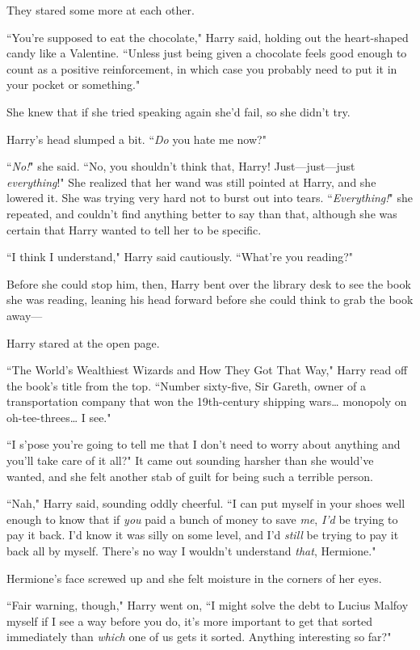 They stared some more at each other.

``You're supposed to eat the chocolate," Harry said, holding out the heart-shaped candy like a Valentine. ``Unless just being given a chocolate feels good enough to count as a positive reinforcement, in which case you probably need to put it in your pocket or something."

She knew that if she tried speaking again she'd fail, so she didn't try.

Harry's head slumped a bit. ``\emph{Do} you hate me now?"

``\emph{No!}" she said. ``No, you shouldn't think that, Harry! Just—just—just \emph{everything}!" She realized that her wand was still pointed at Harry, and she lowered it. She was trying very hard not to burst out into tears. ``\emph{Everything!}" she repeated, and couldn't find anything better to say than that, although she was certain that Harry wanted to tell her to be specific.

``I think I understand," Harry said cautiously. ``What're you reading?"

Before she could stop him, then, Harry bent over the library desk to see the book she was reading, leaning his head forward before she could think to grab the book away—

Harry stared at the open page.

``The World's Wealthiest Wizards and How They Got That Way," Harry read off the book's title from the top. ``Number sixty-five, Sir Gareth, owner of a transportation company that won the 19th-century shipping wars{\ldots} monopoly on oh-tee-threes{\ldots} I see."

``I s'pose you're going to tell me that I don't need to worry about anything and you'll take care of it all?" It came out sounding harsher than she would've wanted, and she felt another stab of guilt for being such a terrible person.

``Nah," Harry said, sounding oddly cheerful. ``I can put myself in your shoes well enough to know that if \emph{you} paid a bunch of money to save \emph{me}, \emph{I'd} be trying to pay it back. I'd know it was silly on some level, and I'd \emph{still} be trying to pay it back all by myself. There's no way I wouldn't understand \emph{that}, Hermione."

Hermione's face screwed up and she felt moisture in the corners of her eyes.

``Fair warning, though," Harry went on, ``I might solve the debt to Lucius Malfoy myself if I see a way before you do, it's more important to get that sorted immediately than \emph{which} one of us gets it sorted. Anything interesting so far?"

